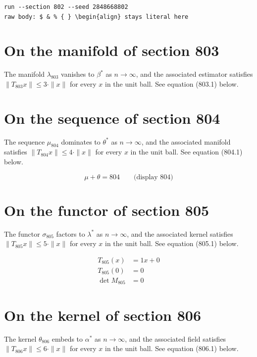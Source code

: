 \documentclass{article}
\begin{document}
\begin{verbatim}
run --section 802 --seed 2848668802
raw body: $ & % { } \begin{align} stays literal here
\end{verbatim}

\section{On the manifold of section 803}
The manifold $\lambda_{803}$ vanishes to $\beta^{*}$ as $n \to \infty$,
and the associated estimator satisfies $\|T_{803} x\| \leq 3 \cdot \|x\|$
for every $x$ in the unit ball. See equation (803.1) below.

\section{On the sequence of section 804}
The sequence $\mu_{804}$ dominates to $\theta^{*}$ as $n \to \infty$,
and the associated manifold satisfies $\|T_{804} x\| \leq 4 \cdot \|x\|$
for every $x$ in the unit ball. See equation (804.1) below.

$$
\mu + \theta = 804 \qquad \text{(display 804)}
$$

\section{On the functor of section 805}
The functor $\sigma_{805}$ factors to $\lambda^{*}$ as $n \to \infty$,
and the associated kernel satisfies $\|T_{805} x\| \leq 5 \cdot \|x\|$
for every $x$ in the unit ball. See equation (805.1) below.

\begin{align}
T_{805}(x) &= 1 x + 0 \\
T_{805}(0) &= 0 \\
\det M_{805} &= 0
\end{align}

\section{On the kernel of section 806}
The kernel $\theta_{806}$ embeds to $\alpha^{*}$ as $n \to \infty$,
and the associated field satisfies $\|T_{806} x\| \leq 6 \cdot \|x\|$
for every $x$ in the unit ball. See equation (806.1) below.
\end{document}
